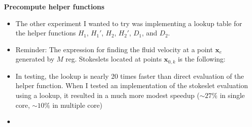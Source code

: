 \documentclass{article}
\begin{document}
\textbf{Precompute helper functions}
\begin{itemize}
\item The other experiment I wanted to try was implementing a lookup
  table for the helper functions $H_1$, $H_1'$, $H_2$, $H_2'$, $D_1$,
  and $D_2$.
\item Reminder: The expression for finding the fluid velocity at a
  point $\mathbf{x}_e$ generated by $M$ reg. Stokeslets located at
  points $\mathbf{x}_{0, k}$ is the following:

\item In testing, the lookup is nearly 20 times faster than direct
  evaluation of the helper function. When I tested an implementation
  of the stokeslet evaluation using a lookup, it resulted in a much
  more modest speedup ($\sim 27\%$ in single core, $\sim 10\%$ in
  multiple core)
\item 
\end{itemize}



\end{document}
